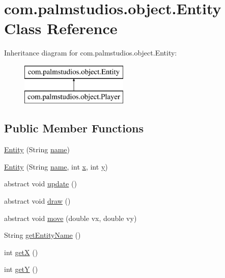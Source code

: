 \hypertarget{classcom_1_1palmstudios_1_1object_1_1_entity}{}\section{com.\+palmstudios.\+object.\+Entity Class Reference}
\label{classcom_1_1palmstudios_1_1object_1_1_entity}
Inheritance diagram for com.\+palmstudios.\+object.\+Entity\+:\begin{figure}[H]
\begin{center}
\leavevmode
\includegraphics[height=2.000000cm]{classcom_1_1palmstudios_1_1object_1_1_entity}
\end{center}
\end{figure}
\subsection*{Public Member Functions}
\begin{DoxyCompactItemize}
\item 
\hyperlink{classcom_1_1palmstudios_1_1object_1_1_entity_add92a93befa9a5d13d4ce83af5fb2404}{Entity} (String \hyperlink{classcom_1_1palmstudios_1_1object_1_1_entity_ad1dd4b4b3fd94cdd50041ed527a15f06}{name})
\item 
\hyperlink{classcom_1_1palmstudios_1_1object_1_1_entity_ac20961b308971ff4da8054665126b9fd}{Entity} (String \hyperlink{classcom_1_1palmstudios_1_1object_1_1_entity_ad1dd4b4b3fd94cdd50041ed527a15f06}{name}, int \hyperlink{classcom_1_1palmstudios_1_1object_1_1_entity_a6afb5022e6335acc944d420251f111fc}{x}, int \hyperlink{classcom_1_1palmstudios_1_1object_1_1_entity_a6bcadd557e5642f4ce95f220f3f7c4c7}{y})
\item 
abstract void \hyperlink{classcom_1_1palmstudios_1_1object_1_1_entity_ac36154420e14204de3c508af9e111bee}{update} ()
\item 
abstract void \hyperlink{classcom_1_1palmstudios_1_1object_1_1_entity_a9f8c2f98ef0f4139c263f074c13afa5e}{draw} ()
\item 
abstract void \hyperlink{classcom_1_1palmstudios_1_1object_1_1_entity_a793d82474f4df98487e4cfee77b89578}{move} (double vx, double vy)
\item 
String \hyperlink{classcom_1_1palmstudios_1_1object_1_1_entity_a2644e0ac79646c6ec8b9eb37c919354d}{get\+Entity\+Name} ()
\item 
int \hyperlink{classcom_1_1palmstudios_1_1object_1_1_entity_a8b7617e59d28fda1735a57440b92f5fb}{getX} ()
\item 
int \hyperlink{classcom_1_1palmstudios_1_1object_1_1_entity_ad4cf3590152be1d829c58b8c55ee88ad}{getY} ()
\end{DoxyCompactItemize}
